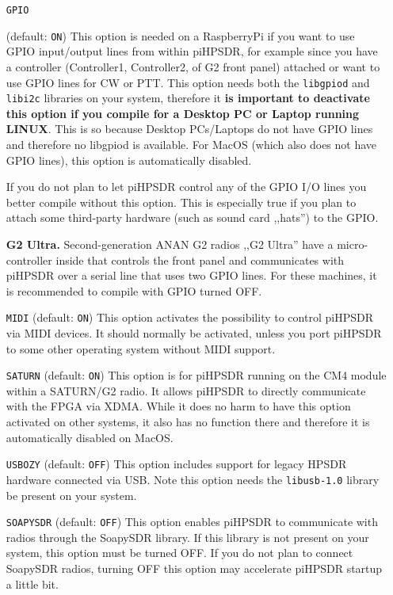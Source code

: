 \documentclass[12pt]{book}
\def\rett#1{\texttt{\color{red}#1}}
\def\pH{pi\-HPSDR\xspace}
\begin{document}
\begin{itemize}
\item[\rett{GPIO}] {(default: \texttt{ON})
This option is needed on a RaspberryPi if you want to use GPIO input/output lines from
within \pH, for example since you have a controller (Controller1, Controller2, of G2 front panel)
attached or want to use GPIO lines for CW or PTT. This option needs both the \texttt{libgpiod} and
\texttt{libi2c} libraries on your system, therefore it \textbf{is important to deactivate this option
if you compile for a Desktop PC or Laptop running LINUX}. This is so because Desktop PCs/Laptops do not
have GPIO lines and therefore no libgpiod is available.
For MacOS (which also does not have GPIO lines),
this option is automatically disabled.

If you do not plan to let \pH control any of the GPIO I/O lines you better compile without this option.
This is especially true if you plan to attach some third-party hardware (such as sound card ,,hats'')
to the GPIO.

{\bf G2 Ultra.} Second-generation ANAN G2 radios ,,G2 Ultra'' have a micro-controller inside that
controls the front panel and communicates with \pH over a serial line that uses two GPIO  lines.
For these machines, it is
recommended to compile with GPIO turned OFF.
}

\item[\rett{MIDI}] {(default: \texttt{ON})
This option activates the possibility to control \pH via MIDI devices. It should normally be
activated, unless you port \pH to some other operating system without MIDI support.
}

\item[\rett{SATURN}] {(default: \texttt{ON})
This option is for \pH running on the CM4 module within a SATURN/G2 radio. It allows
\pH to directly communicate with the FPGA via XDMA. While it does no harm to have this option activated
on other systems, it also has no function there and therefore it is automatically disabled  on MacOS.
}

\item[\rett{USBOZY}] {(default: \texttt{OFF})
This option includes support for legacy HPSDR hardware connected via USB. Note this
option needs the \texttt{libusb-1.0} library  be present on your system.
}

\item[\rett{SOAPYSDR}] {(default: \texttt{OFF})
This option enables \pH to communicate with radios through the SoapySDR library. If this library
is not present on your system, this option must be turned OFF. If you do not plan to connect SoapySDR
radios, turning OFF this option may accelerate \pH startup a little bit.
}


\end{itemize}
\end{document}
